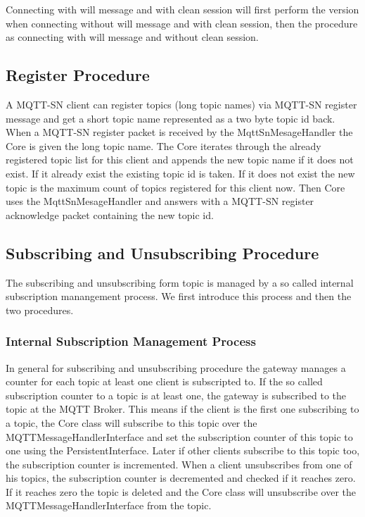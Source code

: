 Connecting with will message and with clean session will first perform the version when connecting without will message and with clean session, then the procedure as connecting with will message and without clean session.

\subsection{Register Procedure}
A MQTT-SN client can register topics (long topic names) via MQTT-SN register message and get a short topic name represented as a two byte topic id back.
When a MQTT-SN register packet is received by the MqttSnMesageHandler the Core is given the long topic name.
The Core iterates through the already registered topic list for this client and appends the new topic name if it does not exist.
If it already exist the existing topic id is taken. If it does not exist the new topic is the  maximum count of topics registered for this client now.
Then Core uses the MqttSnMesageHandler and answers with a MQTT-SN register acknowledge packet containing the new topic id.

\subsection{Subscribing and Unsubscribing Procedure}
The subscribing and unsubscribing form topic is managed by a so called internal subscription manangement process.
We first introduce this process and then the two procedures. 
\subsubsection{Internal Subscription Management Process}
In general for subscribing and unsubscribing procedure the gateway manages a counter for each topic at least one client is subscripted to.
If the so called subscription counter to a topic is at least one, the gateway is subscribed to the topic at the MQTT Broker.
This means if the client is the first one subscribing to a topic, the Core class will subscribe to this topic over the MQTTMessageHandlerInterface and set the subscription counter of this topic to one using the PersistentInterface.
Later if other clients subscribe to this topic too, the subscription counter is incremented.
When a client unsubscribes from one of his topics, the subscription counter is decremented and checked if it reaches zero.
If it reaches zero the topic is deleted and the Core class will unsubscribe over the MQTTMessageHandlerInterface from the topic. 

